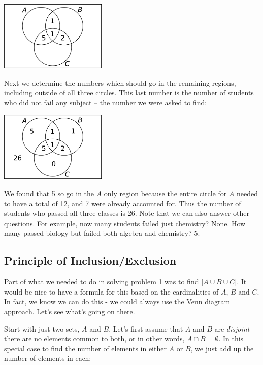 \documentclass[12pt]{article}
\begin{document}
\begin{center}
 \includegraphics[width=2in]{images/venn3prob1b.png}
\end{center}

Next we determine the numbers which should go in the remaining regions, including outside of all three circles.  This last number is the number of students who did not fail any subject -- the number we were asked to find:

\begin{center}
 \includegraphics[width=2in]{images/venn3prob1c.png}
\end{center}

We found that 5 so go in the $A$ only region because the entire circle for $A$ needed to have a total of 12, and 7 were already accounted for.  Thus the number of students who passed all three classes is 26.  Note that we can also answer other questions.  For example, now many students failed just chemistry?  None.  How many passed biology but failed both algebra and chemistry? 5.

\subsection{Principle of Inclusion/Exclusion}

Part of what we needed to do in solving problem 1 was to find $|A \cup B \cup C|$.  It would be nice to have a formula for this based on the cardinalities of $A$, $B$ and $C$.  In fact, we know we can do this - we could always use the Venn diagram approach.  Let's see what's going on there.

Start with just two sets, $A$ and $B$.  Let's first assume that $A$ and $B$ are {\em disjoint} - there are no elements common to both, or in other words, $A \cap B = \emptyset$.  In this special case to find the number of elements in either $A$ or $B$, we just add up the number of elements in each:
\end{document}
